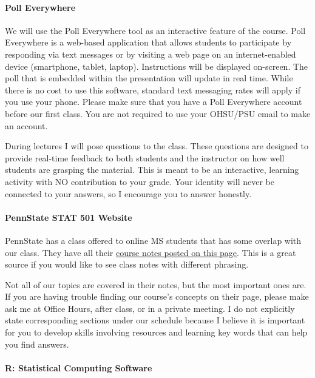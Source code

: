 \documentclass[
  letterpaper,
  DIV=11,
  numbers=noendperiod]{scrartcl}
\let\oldparagraph\paragraph
\renewcommand{\paragraph}[1]{\oldparagraph{#1}\mbox{}}
\begin{document}
\hypertarget{poll-everywhere}{%
\paragraph{Poll Everywhere}\label{poll-everywhere}}

We will use the Poll Everywhere tool as an interactive feature of the
course. Poll Everywhere is a web-based application that allows students
to participate by responding via text messages or by visiting a web page
on an internet-enabled device (smartphone, tablet, laptop). Instructions
will be displayed on-screen. The poll that is embedded within the
presentation will update in real time. While there is no cost to use
this software, standard text messaging rates will apply if you use your
phone. Please make sure that you have a Poll Everywhere account before
our first class. You are not required to use your OHSU/PSU email to make
an account.~

During lectures I will pose questions to the class. These questions are
designed to provide real-time feedback to both students and the
instructor on how well students are grasping the material. This is meant
to be an interactive, learning activity with NO contribution to your
grade. Your identity will never be connected to your answers, so I
encourage you to answer honestly.

\hypertarget{pennstate-stat-501-website}{%
\paragraph{PennState STAT 501
Website}\label{pennstate-stat-501-website}}

PennState has a class offered to online MS students that has some
overlap with our class. They have all their
\href{https://online.stat.psu.edu/stat501/}{course notes posted on this
page}. This is a great source if you would like to see class notes with
different phrasing.

Not all of our topics are covered in their notes, but the most important
ones are. If you are having trouble finding our course's concepts on
their page, please make ask me at Office Hours, after class, or in a
private meeting. I do not explicitly state corresponding sections under
our schedule because I believe it is important for you to develop skills
involving resources and learning key words that can help you find
answers.~

\hypertarget{r-statistical-computing-software}{%
\paragraph{R: Statistical Computing
Software}\label{r-statistical-computing-software}}
\end{document}
